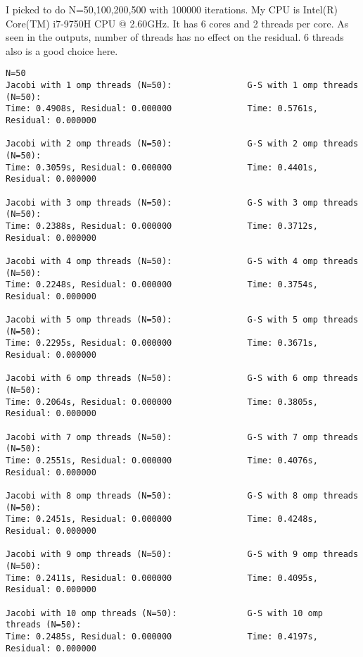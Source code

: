 \documentclass{article}
\begin{document}
I picked to do N=50,100,200,500 with 100000 iterations. My CPU is Intel(R) Core(TM) i7-9750H CPU @ 2.60GHz. It has 6 cores and 2 threads per core. As seen in the outputs, number of threads has no effect on the residual. 6 threads also is a good choice here. 


\begin{lstlisting}
N=50
Jacobi with 1 omp threads (N=50):               G-S with 1 omp threads (N=50):
Time: 0.4908s, Residual: 0.000000               Time: 0.5761s, Residual: 0.000000
                        
Jacobi with 2 omp threads (N=50):               G-S with 2 omp threads (N=50):
Time: 0.3059s, Residual: 0.000000               Time: 0.4401s, Residual: 0.000000
                        
Jacobi with 3 omp threads (N=50):               G-S with 3 omp threads (N=50):
Time: 0.2388s, Residual: 0.000000               Time: 0.3712s, Residual: 0.000000
                        
Jacobi with 4 omp threads (N=50):               G-S with 4 omp threads (N=50):
Time: 0.2248s, Residual: 0.000000               Time: 0.3754s, Residual: 0.000000
                        
Jacobi with 5 omp threads (N=50):               G-S with 5 omp threads (N=50):
Time: 0.2295s, Residual: 0.000000               Time: 0.3671s, Residual: 0.000000
                        
Jacobi with 6 omp threads (N=50):               G-S with 6 omp threads (N=50):
Time: 0.2064s, Residual: 0.000000               Time: 0.3805s, Residual: 0.000000
                        
Jacobi with 7 omp threads (N=50):               G-S with 7 omp threads (N=50):
Time: 0.2551s, Residual: 0.000000               Time: 0.4076s, Residual: 0.000000
                        
Jacobi with 8 omp threads (N=50):               G-S with 8 omp threads (N=50):
Time: 0.2451s, Residual: 0.000000               Time: 0.4248s, Residual: 0.000000
                        
Jacobi with 9 omp threads (N=50):               G-S with 9 omp threads (N=50):
Time: 0.2411s, Residual: 0.000000               Time: 0.4095s, Residual: 0.000000
                        
Jacobi with 10 omp threads (N=50):              G-S with 10 omp threads (N=50):
Time: 0.2485s, Residual: 0.000000               Time: 0.4197s, Residual: 0.000000
                        

\end{lstlisting}
\end{document}

